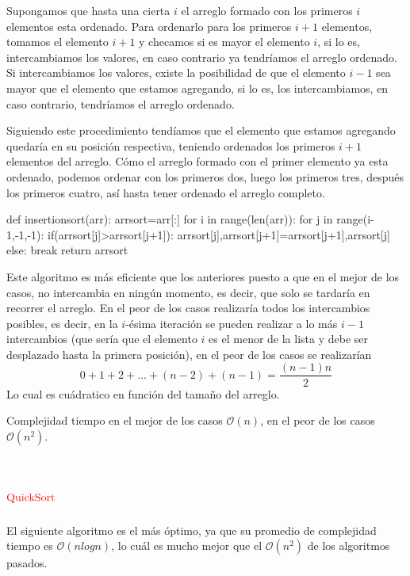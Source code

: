 \documentclass[12pt,a4paper]{article}
\begin{document}
Supongamos que hasta una cierta $i$ el arreglo formado con los primeros $i$ elementos esta ordenado. Para ordenarlo para los primeros $i+1$ elementos, tomamos el elemento $i+1$ y checamos si es mayor el elemento $i$, si lo es, intercambiamos los valores, en caso contrario ya tendr\'iamos el arreglo ordenado. Si intercambiamos los valores, existe la posibilidad de que el elemento $i-1$ sea mayor que el elemento que estamos agregando, si lo es, los intercambiamos, en caso contrario, tendr\'iamos el arreglo ordenado. 

Siguiendo este procedimiento tend\'iamos que el elemento que estamos agregando quedar\'ia en su posici\'on respectiva, teniendo ordenados los primeros $i+1$ elementos del arreglo. C\'omo el arreglo formado con el primer elemento ya esta ordenado, podemos ordenar con los primeros dos, luego los primeros tres, despu\'es los primeros cuatro, as\'i hasta tener ordenado el arreglo completo.


\begin{python}
def insertionsort(arr):
    arrsort=arr[:]
    for i in range(len(arr)):
        for j in range(i-1,-1,-1):
            if(arrsort[j]>arrsort[j+1]):
                arrsort[j],arrsort[j+1]=arrsort[j+1],arrsort[j]
            else:
                break
    return arrsort
\end{python}
 
 Este algoritmo es m\'as eficiente que los anteriores puesto a que en el mejor de los casos, no intercambia en ning\'un momento, es decir, que solo se tardar\'ia en recorrer el arreglo. En el peor de los casos realizar\'ia todos los intercambios posibles, es decir, en la $i$-\'esima iteraci\'on se pueden realizar a lo m\'as $i-1$ intercambios (que ser\'ia que el elemento $i$ es el menor de la lista y debe ser desplazado hasta la primera posici\'on), en el peor de los casos se realizar\'ian $$0+1+2+\dots+(n-2)+(n-1)=\frac{(n-1)n}{2}$$ Lo cual es cu\'adratico en funci\'on del tama\~no del arreglo. 
 
 Complejidad tiempo en el mejor de los casos $\mathcal{O}(n)$, en el peor de los casos $\mathcal{O}(n^2)$.

\section{$\textcolor{red}{\mathrm{QuickSort}}$
}

El siguiente algoritmo es el m\'as \'optimo, ya que su promedio de complejidad tiempo es $\mathcal{O}(nlog{}n)$, lo cu\'al es mucho mejor que el $\mathcal{O}(n^2)$ de los algoritmos pasados.
\newline
\end{document}
